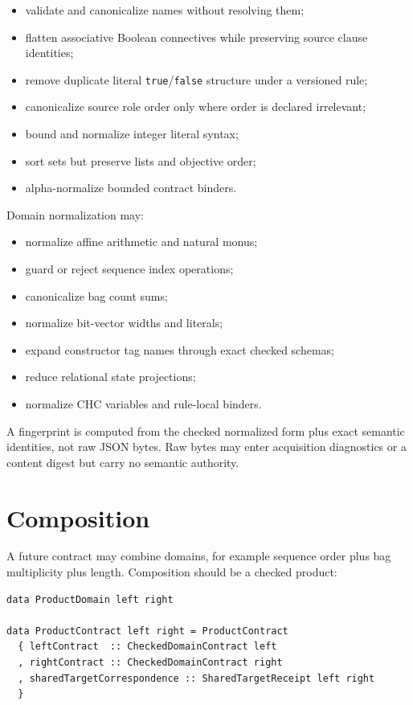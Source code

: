 \documentclass[11pt,oneside]{report}
\newcommand{\code}[1]{\texttt{#1}}
\begin{document}
\begin{itemize}[leftmargin=2em]
\item validate and canonicalize names without resolving them;
\item flatten associative Boolean connectives while preserving source clause identities;
\item remove duplicate literal \code{true}/\code{false} structure under a versioned rule;
\item canonicalize source role order only where order is declared irrelevant;
\item bound and normalize integer literal syntax;
\item sort sets but preserve lists and objective order;
\item alpha-normalize bounded contract binders.
\end{itemize}

Domain normalization may:

\begin{itemize}[leftmargin=2em]
\item normalize affine arithmetic and natural monus;
\item guard or reject sequence index operations;
\item canonicalize bag count sums;
\item normalize bit-vector widths and literals;
\item expand constructor tag names through exact checked schemas;
\item reduce relational state projections;
\item normalize CHC variables and rule-local binders.
\end{itemize}

A fingerprint is computed from the checked normalized form plus exact semantic identities, not raw JSON bytes. Raw bytes may enter acquisition diagnostics or a content digest but carry no semantic authority.

\section{Composition}

A future contract may combine domains, for example sequence order plus bag multiplicity plus length. Composition should be a checked product:

\begin{lstlisting}[language=HaskellX,caption={Conceptual checked product of observation domains.}]
data ProductDomain left right

data ProductContract left right = ProductContract
  { leftContract  :: CheckedDomainContract left
  , rightContract :: CheckedDomainContract right
  , sharedTargetCorrespondence :: SharedTargetReceipt left right
  }
\end{lstlisting}
\end{document}
